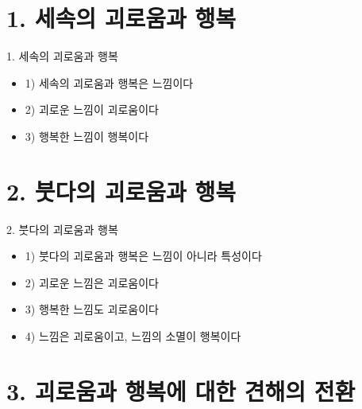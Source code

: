 \documentclass[aspectratio=1610,14pt,xcolor=pdftex,dvipsnames,table,handout]{beamer}
\begin{document}
		\section{1. 세속의 괴로움과 행복}
		\frame [plain] {\sectionpage}


		\begin{frame} [t,plain]
			\begin{block} {1. 세속의 괴로움과 행복}
			\begin{itemize}
				\item 1) 세속의 괴로움과 행복은 느낌이다
				\item 2) 괴로운 느낌이 괴로움이다
				\item 3) 행복한 느낌이 행복이다
			\end{itemize}
			\end{block}
		\end{frame}

		\section{2. 붓다의 괴로움과 행복}
		\frame [plain] {\sectionpage}

		\begin{frame} [t,plain]
			\begin{block} {2. 붓다의 괴로움과 행복}
			\begin{itemize}
				\item 1) 붓다의 괴로움과 행복은 느낌이 아니라 특성이다
				\item 2) 괴로운 느낌은 괴로움이다
				\item 3) 행복한 느낌도 괴로움이다
				\item 4) 느낌은 괴로움이고, 느낌의 소멸이 행복이다
			\end{itemize}
			\end{block}
		\end{frame}


		\section{3. 괴로움과 행복에 대한 견해의 전환}
		\frame [plain] {\sectionpage}
\end{document}
